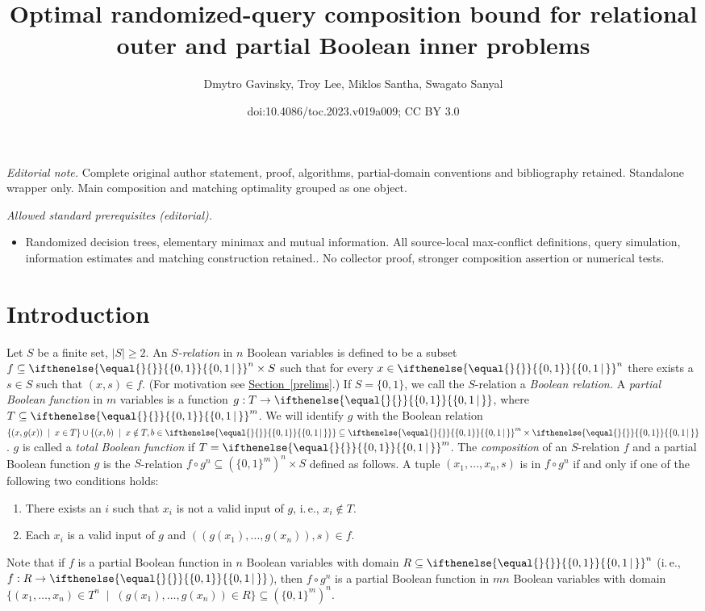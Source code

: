 \documentclass[11pt]{article}
\title{Optimal randomized-query composition bound for relational outer and partial Boolean inner problems}
\author{Dmytro Gavinsky, Troy Lee, Miklos Santha, Swagato Sanyal}
\date{doi:10.4086/toc.2023.v019a009; CC BY 3.0}
\numberwithin{equation}{section}
\theoremstyle{definition}
\theoremstyle{plain}
\newcommand{\ie}{i.\,e.}
\newcommand{\expref}[2]{\hyperref[#2]{#1~\ref{#2}}}
\newcommand{\relation}{$S$-relation\xspace}     %
\newcommand{\arelation}{an $S$-relation\xspace} %
\newcommand{\md}{\middle}
\newcommand{\set}[2][]{\ifthenelse{\equal{}{#1}}%
{\ensuremath{\left\{#2\right\}}}%
{\ensuremath{\left\{#2\,\md|\,#1\right\}}}}
\newcommand{\OI}{\set{0,1}}
\newcommand{\e}{\emph}
\begin{document}
\maketitle
\noindent\textit{Editorial note.} Complete original author statement, proof, algorithms, partial-domain conventions and bibliography retained. Standalone wrapper only. Main composition and matching optimality grouped as one object.\par\medskip
\noindent\textit{Allowed standard prerequisites (editorial).}\begin{itemize}
\item Randomized decision trees, elementary minimax and mutual information. All source-local max-conflict definitions, query simulation, information estimates and matching construction retained.. No collector proof, stronger composition assertion or numerical tests.
\end{itemize}\medskip
\section{Introduction}
\label{intro}
%
Let $S$ be a finite set, $|S|\ge 2$.  %
%
%
An \emph{$S$-relation}  %
in $n$ Boolean
variables is defined to be a subset $f \subseteq \OI^n \times S$
%
%
%
%
such  %
that for every $x \in \OI^n$ there exists a $s \in S$ such that $(x, s) \in f$.
%
%
%
(For motivation see \expref{Section}{prelims}.)  %
%
If $S=\{0,1\}$, we call the \relation a \emph{Boolean relation.}  %
A \emph{partial Boolean function} in $m$ variables is a
function $g:T \to \OI$, where 
%
$T \subseteq \OI^m$.   %
We will identify $g$ with the
Boolean  %
relation $\{(x, g(x))\;\mid\;x \in T\} \cup \{(x, b)\;\mid\;x \notin T, b \in \OI\}\subseteq \OI^m \times \OI$.
%
$g$ is called a \e{total Boolean function} if $T=\OI^m$.
%
The \emph{composition} of %
\arelation  %
$f$ and a partial Boolean function %
$g$ is   %
%
the \relation  %
%
$f \circ g^n \subseteq \left(\{0,1\}^m\right)^n \times S$ 
%
defined as %
follows.  A  %
tuple $(x_1, \ldots, x_n, s)$ is in $f \circ g^n$ 
if and only if one of the
following %
two conditions holds:   %
\begin{enumerate}
    \item There exists an $i$ such that $x_i$ is not a valid input of $g$,
    \ie, $x_i \notin T$. 
\item Each $x_i$ is a valid input of $g$ and $((g(x_1),\ldots,g(x_n)),s)\in f$.
\end{enumerate}
Note that if $f$ is a partial Boolean function
in $n$ Boolean variables with domain $R \subseteq \OI^n$ 
(\ie,  %
$f:R \to \OI$), then $f \circ g^n$ is a partial Boolean function 
in $mn$ Boolean variables with domain 
%
%
%
$\{(x_1,\ldots, x_n) \in T^n \;\mid\;   %
(g(x_1),\ldots, g(x_n)) \in R\} \subseteq \left(\{0,1\}^m\right)^n$.
\end{document}
